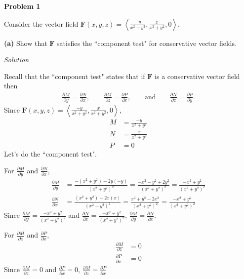 \documentclass{article}
\newcommand{\lra}[1]{\left\langle #1 \right\rangle}
\newcommand{\F}[0]{\mathbf{F}}
\newcommand{\Solution}{\textit{Solution}}
\begin{document}
{}\textbf{Problem 1}

Consider the vector field $\displaystyle\F(x,y,z)=\lra{\frac{-y}{x^2+y^2},\frac{x}{x^2+y^2},0}$.

{}\textbf{(a)} Show that $\F$ satisfies the ``component test" for conservative vector fields.

\Solution

Recall that the ``component test" states that if $\F$ is a conservative vector field then
\begin{align*}
    \frac{\partial M}{\partial y}=\frac{\partial N}{\partial x},\hspace{2em}\frac{\partial M}{\partial z}=\frac{\partial P}{\partial x},\hspace{2em} \text{and}\hspace{2em}\frac{\partial N}{\partial z}=\frac{\partial P}{\partial y}.
\end{align*}
Since $\displaystyle\F(x,y,z)=\lra{\frac{-y}{x^2+y^2},\frac{x}{x^2+y^2},0}$, \begin{align*}
    M&=\frac{-y}{x^2+y^2}\\
    N&=\frac{x}{x^2+y^2}\\
    P&=0
\end{align*}
Let's do the ``component test".

{}
For $\displaystyle \frac{\partial M}{\partial y}$ and $\displaystyle\frac{\partial N}{\partial x}$,
\begin{align*}
    \frac{\partial M}{\partial y}&=\frac{-(x^2+y^2)-2y(-y)}{(x^2+y^2)^2}=\frac{-x^2-y^2+2y^2}{(x^2+y^2)^2}=\frac{-x^2+y^2}{(x^2+y^2)^2}\\
    \frac{\partial N}{\partial x}&=
    \frac{(x^2+y^2)-2x(x)}{(x^2+y^2)^2}=\frac{x^2+y^2-2x^2}{(x^2+y^2)^2}=\frac{-x^2+y^2}{(x^2+y^2)^2}
\end{align*}
Since $\displaystyle \frac{\partial M}{\partial y}=\frac{-x^2+y^2}{(x^2+y^2)^2}$ and $\displaystyle \frac{\partial N}{\partial x}=\frac{-x^2+y^2}{(x^2+y^2)^2}$, $\displaystyle \frac{\partial M}{\partial y}=\frac{\partial N}{\partial x}$.

{}
For $\displaystyle \frac{\partial M}{\partial z}$ and $\displaystyle\frac{\partial P}{\partial x}$,
\begin{align*}
     \frac{\partial M}{\partial z}&=0\\
     \frac{\partial P}{\partial x}&=
     0
\end{align*}
Since $\displaystyle \frac{\partial M}{\partial z}=0$ and $\displaystyle \frac{\partial P}{\partial x}=0$, $\displaystyle \frac{\partial M}{\partial z}=\frac{\partial P}{\partial x}$
\end{document}
